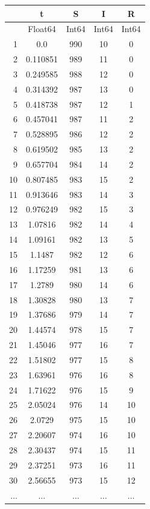 \documentclass[
  12pt,
  a4paper,
  DIV=11,
  numbers=noendperiod]{scrreprt}
\begin{document}
\begin{tabular}{r|cccc}
    & t & S & I & R\\
    \hline
    & Float64 & Int64 & Int64 & Int64\\
    \hline
    1 & 0.0 & 990 & 10 & 0 \\
    2 & 0.110851 & 989 & 11 & 0 \\
    3 & 0.249585 & 988 & 12 & 0 \\
    4 & 0.314392 & 987 & 13 & 0 \\
    5 & 0.418738 & 987 & 12 & 1 \\
    6 & 0.457041 & 987 & 11 & 2 \\
    7 & 0.528895 & 986 & 12 & 2 \\
    8 & 0.619502 & 985 & 13 & 2 \\
    9 & 0.657704 & 984 & 14 & 2 \\
    10 & 0.807485 & 983 & 15 & 2 \\
    11 & 0.913646 & 983 & 14 & 3 \\
    12 & 0.976249 & 982 & 15 & 3 \\
    13 & 1.07816 & 982 & 14 & 4 \\
    14 & 1.09161 & 982 & 13 & 5 \\
    15 & 1.1487 & 982 & 12 & 6 \\
    16 & 1.17259 & 981 & 13 & 6 \\
    17 & 1.2789 & 980 & 14 & 6 \\
    18 & 1.30828 & 980 & 13 & 7 \\
    19 & 1.37686 & 979 & 14 & 7 \\
    20 & 1.44574 & 978 & 15 & 7 \\
    21 & 1.45046 & 977 & 16 & 7 \\
    22 & 1.51802 & 977 & 15 & 8 \\
    23 & 1.63961 & 976 & 16 & 8 \\
    24 & 1.71622 & 976 & 15 & 9 \\
    25 & 2.05024 & 976 & 14 & 10 \\
    26 & 2.0729 & 975 & 15 & 10 \\
    27 & 2.20607 & 974 & 16 & 10 \\
    28 & 2.30437 & 974 & 15 & 11 \\
    29 & 2.37251 & 973 & 16 & 11 \\
    30 & 2.56655 & 973 & 15 & 12 \\
    $\dots$ & $\dots$ & $\dots$ & $\dots$ & $\dots$ \\
\end{tabular}
\end{document}

